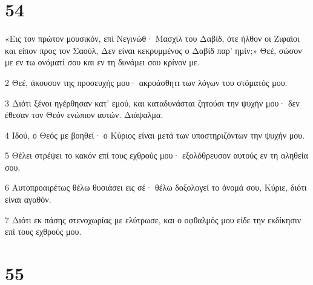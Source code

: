 \chapter{54}

\par «Εις τον πρώτον μουσικόν, επί Νεγινώθ· Μασχίλ του Δαβίδ, ότε ήλθον οι Ζιφαίοι και είπον προς τον Σαούλ, Δεν είναι κεκρυμμένος ο Δαβίδ παρ' ημίν;» Θεέ, σώσον με εν τω ονόματί σου και εν τη δυνάμει σου κρίνον με.
\par 2 Θεέ, άκουσον της προσευχής μου· ακροάσθητι των λόγων του στόματός μου.
\par 3 Διότι ξένοι ηγέρθησαν κατ' εμού, και καταδυνάσται ζητούσι την ψυχήν μου· δεν έθεσαν τον Θεόν ενώπιον αυτών. Διάψαλμα.
\par 4 Ιδού, ο Θεός με βοηθεί· ο Κύριος είναι μετά των υποστηριζόντων την ψυχήν μου.
\par 5 Θέλει στρέψει το κακόν επί τους εχθρούς μου· εξολόθρευσον αυτούς εν τη αληθεία σου.
\par 6 Αυτοπροαιρέτως θέλω θυσιάσει εις σέ· θέλω δοξολογεί το όνομά σου, Κύριε, διότι είναι αγαθόν.
\par 7 Διότι εκ πάσης στενοχωρίας με ελύτρωσε, και ο οφθαλμός μου είδε την εκδίκησιν επί τους εχθρούς μου.

\chapter{55}


